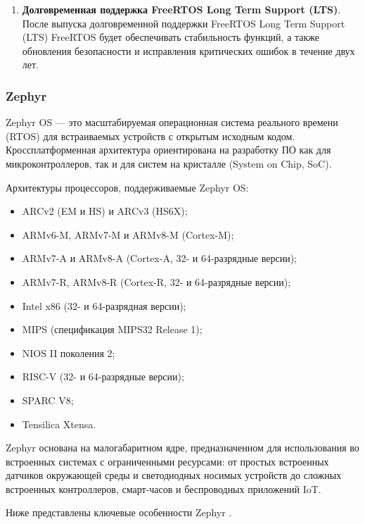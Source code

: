 \begin{enumerate}[label*=\arabic*.]
	\item \textbf{Долговременная поддержка FreeRTOS Long Term Support (LTS)}. \newline
	После выпуска долговременной поддержки FreeRTOS Long Term Support (LTS) FreeRTOS будет обеспечивать стабильность функций, а также обновления безопасности и исправления критических ошибок в течение двух лет.
	
\end{enumerate}



\subsubsection{Zephyr}

Zephyr OS \cite{Embedded_OS_lecture} --- это масштабируемая операционная система реального времени (RTOS) для встраиваемых устройств с открытым исходным кодом. Кроссплатформенная архитектура ориентирована на разработку ПО как для микроконтроллеров, так и для систем на кристалле (System on Chip, SoC).

Архитектуры процессоров, поддерживаемые Zephyr OS:

\begin{itemize}[label*=---]
	\item ARCv2 (EM и HS) и ARCv3 (HS6X);
	\item ARMv6-M, ARMv7-M и ARMv8-M (Cortex-M);
	\item ARMv7-A и ARMv8-A (Cortex-A, 32- и 64-разрядные версии);
	\item ARMv7-R, ARMv8-R (Cortex-R, 32- и 64-разрядные версии);
	\item Intel x86 (32- и 64-разрядная версии);
	\item MIPS (спецификация MIPS32 Release 1);
	\item NIOS II поколения 2;
	\item RISC-V (32- и 64-разрядные версии);
	\item SPARC V8;
	\item Tensilica Xtensa.
\end{itemize}

Zephyr \cite{Zephyr_overview} основана на малогабаритном ядре, предназначенном для использования во встроенных системах с ограниченными ресурсами: от простых встроенных датчиков окружающей среды и светодиодных носимых устройств до сложных встроенных контроллеров, смарт-часов и беспроводных приложений IoT.

Ниже представлены ключевые особенности Zephyr \cite{Embedded_OS_lecture} \cite{Zephyr_overview}.

